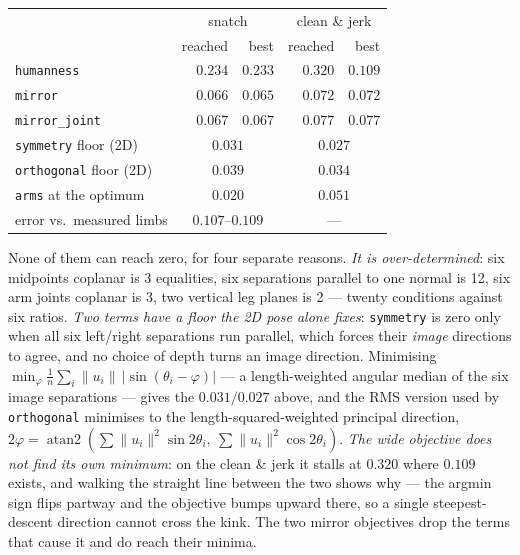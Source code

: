 \documentclass[10pt,a4paper]{article}
\begin{document}
\begin{center}\small
\begin{tabular}{lrrrr}
\hline
 & \multicolumn{2}{c}{snatch} & \multicolumn{2}{c}{clean \& jerk}\\
 & reached & best & reached & best\\
\hline
\texttt{humanness} & $0.234$ & $0.233$ & $0.320$ & $0.109$\\
\texttt{mirror}      & $0.066$ & $0.065$ & $0.072$ & $0.072$\\
\texttt{mirror\_joint} & $0.067$ & $0.067$ & $0.077$ & $0.077$\\
\hline
\texttt{symmetry} floor (2D) & \multicolumn{2}{c}{$0.031$} & \multicolumn{2}{c}{$0.027$}\\
\texttt{orthogonal} floor (2D) & \multicolumn{2}{c}{$0.039$} & \multicolumn{2}{c}{$0.034$}\\
\texttt{arms} at the optimum & \multicolumn{2}{c}{$0.020$} & \multicolumn{2}{c}{$0.051$}\\
error vs.\ measured limbs & \multicolumn{2}{c}{$0.107$--$0.109$} & \multicolumn{2}{c}{---}\\
\hline
\end{tabular}
\end{center}

None of them can reach zero, for four separate reasons. \emph{It is
over-determined}: six midpoints coplanar is 3 equalities, six separations
parallel to one normal is 12, six arm joints coplanar is 3, two vertical leg
planes is 2 --- twenty conditions against six ratios. \emph{Two terms have a
floor the 2D pose alone fixes}: \texttt{symmetry} is zero only when all six
left/right separations run parallel, which forces their \emph{image} directions
to agree, and no choice of depth turns an image direction. Minimising
$\min_\varphi\frac{1}{n}\sum_i\lVert u_i\rVert\,\lvert\sin(\theta_i-\varphi)\rvert$
--- a length-weighted angular median of the six image separations --- gives the
$0.031/0.027$ above, and the RMS version used by \texttt{orthogonal} minimises
to the length-squared-weighted principal direction,
$2\varphi=\operatorname{atan2}(\sum\lVert u_i\rVert^2\sin2\theta_i,\ \sum\lVert
u_i\rVert^2\cos2\theta_i)$. \emph{The wide objective does not find its own
minimum}: on the clean \& jerk it stalls at $0.320$ where $0.109$ exists, and
walking the straight line between the two shows why --- the argmin sign flips
partway and the objective bumps upward there, so a single steepest-descent
direction cannot cross the kink. The two mirror objectives drop the terms that
cause it and do reach their minima.
\end{document}

